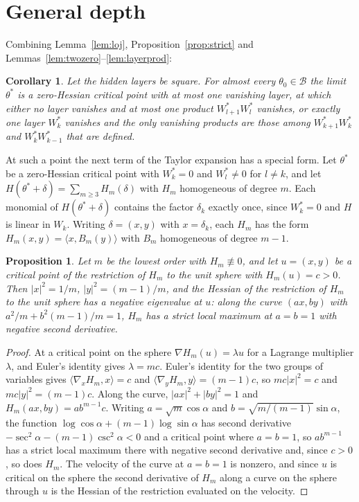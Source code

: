\documentclass[11pt]{amsart}
\newtheorem{proposition}[theorem]{Proposition}
\newtheorem{corollary}[theorem]{Corollary}
\theoremstyle{definition}
\theoremstyle{remark}
\numberwithin{equation}{section}
\begin{document}
\section{General depth}\label{sec:general}
Combining Lemma~\ref{lem:loj}, Proposition~\ref{prop:strict} and Lemmas~\ref{lem:twozero}--\ref{lem:layerprod}:

\begin{corollary}\label{cor:reduction}
Let the hidden layers be square. For almost every $\theta_0\in\mathcal{B}$ the limit $\theta^*$ is a zero-Hessian critical point with at most one vanishing layer, at which either no layer vanishes and at most one product $W^*_{l+1}W^*_l$ vanishes, or exactly one layer $W^*_k$ vanishes and the only vanishing products are those among $W^*_{k+1}W^*_k$ and $W^*_kW^*_{k-1}$ that are defined.
\end{corollary}

At such a point the next term of the Taylor expansion has a special form. Let $\theta^*$ be a zero-Hessian critical point with $W_k^*=0$ and $W_l^*\ne0$ for $l\ne k$, and let $H(\theta^*+\delta)=\sum_{m\ge3}H_m(\delta)$ with $H_m$ homogeneous of degree $m$. Each monomial of $H(\theta^*+\delta)$ contains the factor $\delta_k$ exactly once, since $W_k^*=0$ and $H$ is linear in $W_k$. Writing $\delta=(x,y)$ with $x=\delta_k$, each $H_m$ has the form $H_m(x,y)=\langle x,B_m(y)\rangle$ with $B_m$ homogeneous of degree $m-1$.

\begin{proposition}\label{prop:scaling}
Let $m$ be the lowest order with $H_m\not\equiv0$, and let $u=(x,y)$ be a critical point of the restriction of $H_m$ to the unit sphere with $H_m(u)=c>0$. Then $|x|^2=1/m$, $|y|^2=(m-1)/m$, and the Hessian of the restriction of $H_m$ to the unit sphere has a negative eigenvalue at $u$: along the curve $(ax,by)$ with $a^2/m+b^2(m-1)/m=1$, $H_m$ has a strict local maximum at $a=b=1$ with negative second derivative.
\end{proposition}
\begin{proof}
At a critical point on the sphere $\nabla H_m(u)=\lambda u$ for a Lagrange multiplier $\lambda$, and Euler's identity gives $\lambda=mc$. Euler's identity for the two groups of variables gives $\langle\nabla_xH_m,x\rangle=c$ and $\langle\nabla_yH_m,y\rangle=(m-1)c$, so $mc|x|^2=c$ and $mc|y|^2=(m-1)c$. Along the curve, $|ax|^2+|by|^2=1$ and $H_m(ax,by)=ab^{m-1}c$. Writing $a=\sqrt m\cos\alpha$ and $b=\sqrt{m/(m-1)}\sin\alpha$, the function $\log\cos\alpha+(m-1)\log\sin\alpha$ has second derivative $-\sec^2\alpha-(m-1)\csc^2\alpha<0$ and a critical point where $a=b=1$, so $ab^{m-1}$ has a strict local maximum there with negative second derivative and, since $c>0$, so does $H_m$. The velocity of the curve at $a=b=1$ is nonzero, and since $u$ is critical on the sphere the second derivative of $H_m$ along a curve on the sphere through $u$ is the Hessian of the restriction evaluated on the velocity.
\end{proof}
\end{document}
